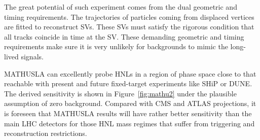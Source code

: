 The great potential of such experiment comes from the dual geometric and timing
requirements. The trajectories of particles coming from displaced
vertices are fitted to reconstruct SVs. These SVs must satisfy the rigorous
condition that all tracks coincide in time at the SV. These demanding geometric and timing
requirements make sure it is very unlikely for backgrounds to mimic
the long-lived signals.

MATHUSLA can excellently probe HNLs in a region of phase space close to that reachable
with present and future fixed-target experiments like SHiP or
DUNE. The derived sensitivity is shown in Figure~\ref{fig:mathu2} under
the plausible assumption of zero background. Compared with CMS and
ATLAS projections, it is foreseen that MATHUSLA results will have rather
better sensitivity than the main LHC detectors for those HNL mass
regimes that suffer from triggering and reconstruction restrictions.



